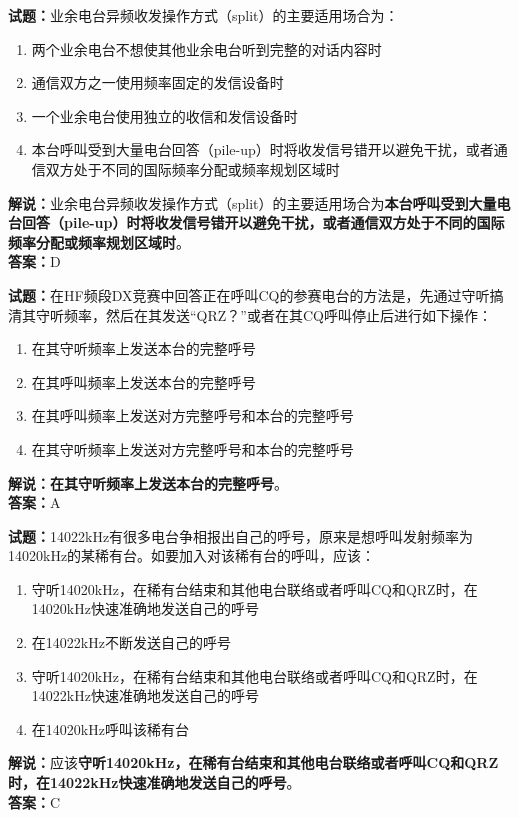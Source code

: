 \documentclass{ctexbook}
\begin{document}
\bigskip

\noindent\textbf{试题：}业余电台异频收发操作方式（split）的主要适用场合为：
\begin{enumerate}[leftmargin=3em]
  \item 两个业余电台不想使其他业余电台听到完整的对话内容时
  \item 通信双方之一使用频率固定的发信设备时
  \item 一个业余电台使用独立的收信和发信设备时
  \item 本台呼叫受到大量电台回答（pile-up）时将收发信号错开以避免干扰，或者通信双方处于不同的国际频率分配或频率规划区域时
\end{enumerate}
\noindent\textbf{解说：}业余电台异频收发操作方式（split）的主要适用场合为\textbf{本台呼叫受到大量电台回答（pile-up）时将收发信号错开以避免干扰，或者通信双方处于不同的国际频率分配或频率规划区域时}。\\\noindent\textbf{答案：}D

\bigskip

\noindent\textbf{试题：}在HF频段DX竞赛中回答正在呼叫CQ的参赛电台的方法是，先通过守听搞清其守听频率，然后在其发送“QRZ？”或者在其CQ呼叫停止后进行如下操作：
\begin{enumerate}[leftmargin=3em]
  \item 在其守听频率上发送本台的完整呼号
  \item 在其呼叫频率上发送本台的完整呼号
  \item 在其呼叫频率上发送对方完整呼号和本台的完整呼号
  \item 在其守听频率上发送对方完整呼号和本台的完整呼号
\end{enumerate}
\noindent\textbf{解说：}\textbf{在其守听频率上发送本台的完整呼号}。\\\noindent\textbf{答案：}A

\bigskip

\noindent\textbf{试题：}14022\si{\kHz}有很多电台争相报出自己的呼号，原来是想呼叫发射频率为14020\si{\kHz}的某稀有台。如要加入对该稀有台的呼叫，应该：
\begin{enumerate}[leftmargin=3em]
  \item 守听14020\si{\kHz}，在稀有台结束和其他电台联络或者呼叫CQ和QRZ时，在14020\si{\kHz}快速准确地发送自己的呼号
  \item 在14022\si{\kHz}不断发送自己的呼号
  \item 守听14020\si{\kHz}，在稀有台结束和其他电台联络或者呼叫CQ和QRZ时，在14022\si{\kHz}快速准确地发送自己的呼号
  \item 在14020\si{\kHz}呼叫该稀有台
\end{enumerate}
\noindent\textbf{解说：}应该\textbf{守听14020\si{\kHz}，在稀有台结束和其他电台联络或者呼叫CQ和QRZ时，在14022\si{\kHz}快速准确地发送自己的呼号}。\\\noindent\textbf{答案：}C
\end{document}
